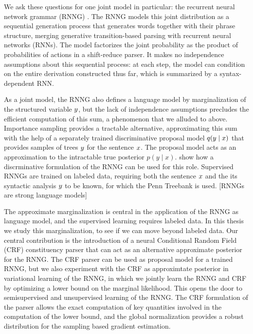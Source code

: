   We ask these questions for one joint model in particular: the recurrent neural network grammar (RNNG) \citep{dyer2016rnng}. The RNNG models this joint distribution as a sequential generation process that generates words together with their phrase structure, merging generative transition-based parsing with recurrent neural networks (RNNs). The model factorizes the joint probability as the product of probabilities of actions in a shift-reduce parser. It makes no independence assumptions about this sequential process: at each step, the model can condition on the entire derivation constructed thus far, which is summarized by a syntax-dependent RNN.

  As a joint model, the RNNG also defines a language model by marginalization of the structured variable $y$, but the lack of independence assumptions precludes the efficient computation of this sum, a phenomenon that we alluded to above. Importance sampling provides a tractable alternative, approximating this sum with the help of a separately trained discriminative proposal model $q(y \mid x)$ that provides samples of trees $y$ for the sentence $x$. The proposal model acts as an approximation to the intractable true posterior $p(y \mid x)$. \citet{dyer2016rnng} show how a discrminative formulation of the RNNG can be used for this role. Supervised RNNGs are trained on labeled data, requiring both the sentence $x$ and the its syntactic analysis $y$ to be known, for which the Penn Treebank \citep{marcus1993penn} is used. [RNNGs are strong language models]

  The approximate marginalization is central in the application of the RNNG as language model, and the supervised learning requires labeled data. In this thesis we study this marginalization, to see if we can move beyond labeled data. Our central contribution is the introduction of a neural Conditional Random Field (CRF) constituency parser that can act as an alternative approximate posterior for the RNNG. The CRF parser can be used as proposal model for a trained RNNG, but we also experiment with the CRF as approximtate posterior in variational learning of the RNNG, in which we jointly learn the RNNG and CRF by optimizing a lower bound on the marginal likelihood. This opens the door to semisupervised and unsupervised learning of the RNNG. The CRF formulation of the parser allows the exact computation of key quantities involved in the computation of the lower bound, and the global normalization provides a robust distribution for the sampling based gradient estimation.

